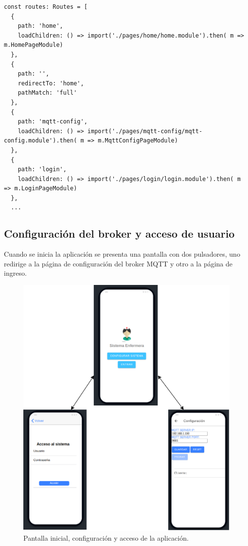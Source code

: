 \begin{lstlisting}[label=cod:Rutas aplicación Móvil.,caption=  Fragmento de las rutas de la aplicación móvil]
const routes: Routes = [
  {
    path: 'home',
    loadChildren: () => import('./pages/home/home.module').then( m => m.HomePageModule)
  },
  {
    path: '',
    redirectTo: 'home',
    pathMatch: 'full'
  },
  {
    path: 'mqtt-config',
    loadChildren: () => import('./pages/mqtt-config/mqtt-config.module').then( m => m.MqttConfigPageModule)
  },
  {
    path: 'login',
    loadChildren: () => import('./pages/login/login.module').then( m => m.LoginPageModule)
  },
  ...

\end{lstlisting} 

\pagebreak

\subsection{Configuración del broker y acceso de usuario}

Cuando se inicia la aplicación se presenta una pantalla con dos pulsadores, uno redirige a la página de configuración del broker MQTT y otro a la página de ingreso.
\begin{figure}[ht]
	\centering
	\includegraphics[scale=.80]{./Figures/app/inicioApp.png}
	\caption{ Pantalla inicial, configuración y acceso de la aplicación.}
	\label{fig: Pantalla inicial, configuración y acceso de la aplicación.}
\end{figure} 

